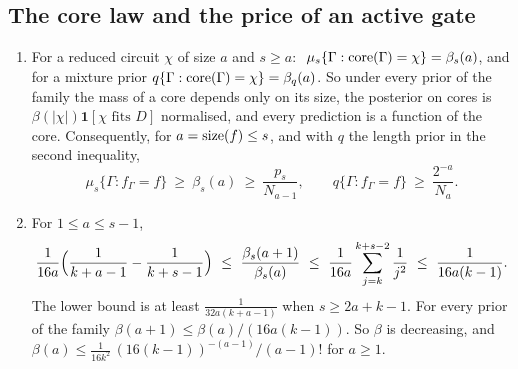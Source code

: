 \subsection{The core law and the price of an active gate}

\begin{theorem}\label{thm:c-core}
\begin{enumerate}[label=(\alph*),leftmargin=2em,itemsep=2pt,topsep=2pt]
\item For a reduced circuit $\chi$ of size $a$ and $s\ge a$:
$\ \mu_s\{\Gamma:\ccore(\Gamma)=\chi\}=\beta_s(a)$, and for a mixture prior
$q\{\Gamma:\mathrm{core}(\Gamma)=\chi\}=\beta_q(a)$. So under every prior of the family the mass of a core depends
only on its size, the posterior on cores is $\beta(|\chi|)\mathbf 1[\chi\text{ fits }D]$ normalised, and every
prediction is a function of the core. Consequently, for $a=\mathrm{size}(f)\le s$, and with $q$ the length prior in
the second inequality,
\[
\mu_s\{\Gamma:f_\Gamma=f\}\ \ge\ \beta_s(a)\ \ge\ \frac{p_s}{N_{a-1}},\qquad
q\{\Gamma:f_\Gamma=f\}\ \ge\ \frac{2^{-a}}{N_a}.
\]
\item For $1\le a\le s-1$,
\[
\frac1{16a}\Bigl(\frac1{k+a-1}-\frac1{k+s-1}\Bigr)\ \le\ \frac{\beta_s(a+1)}{\beta_s(a)}\ \le\
\frac1{16a}\sum_{j=k}^{k+s-2}\frac1{j^2}\ \le\ \frac1{16a(k-1)}.
\]
The lower bound is at least $\frac1{32a(k+a-1)}$ when $s\ge2a+k-1$. For every prior of the family
$\beta(a+1)\le\beta(a)/(16a(k-1))$. So $\beta$ is decreasing, and
$\beta(a)\le\frac1{16k^2}\,(16(k-1))^{-(a-1)}/(a-1)!$ for $a\ge1$.
\end{enumerate}
\end{theorem}
